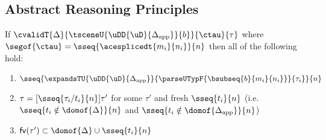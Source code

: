 \subsection{Abstract Reasoning Principles}\label{appendix:SES-reasoning-principles}
\begin{lemma} 
\label{thm:proto-type-expansion-decomposition-SES}
If $\cvalidT{\Delta}{\tsceneU{\uDD{\uD}{\Delta_\text{app}}}{b}}{\ctau}{\tau}$ where $\segof{\ctau} = \sseq{\acesplicedt{m_i}{n_i}}{n}$ then all of the following hold:
\begin{enumerate}
\item $\sseq{\expandsTU{\uDD{\uD}{\Delta_\text{app}}}{
  \parseUTypF{\bsubseq{b}{m_i}{n_i}}
}{\tau_i}}{n}$
\item $\tau = [\sseq{\tau_i/t_i}{n}]\tau'$ for some $\tau'$ and fresh $\sseq{t_i}{n}$ (i.e.  $\sseq{t_i \notin \domof{\Delta}}{n}$ and $\sseq{t_i \notin \domof{\Delta_\text{app}}}{n}$)
\item $\mathsf{fv}(\tau') \subset \domof{\Delta} \cup \sseq{t_i}{n}$
\end{enumerate}
\end{lemma}
